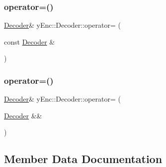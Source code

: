 \hypertarget{classy_enc_1_1_decoder_a7d1922d028848caa6ed0bb8f9c7662ab}{}\label{classy_enc_1_1_decoder_a7d1922d028848caa6ed0bb8f9c7662ab} 
\subsubsection{\texorpdfstring{operator=()}{operator=()}\hspace{0.1cm}{\footnotesize\ttfamily [1/2]}}
{\footnotesize\ttfamily \hyperlink{classy_enc_1_1_decoder}{Decoder}\& y\+Enc\+::\+Decoder\+::operator= (\begin{DoxyParamCaption}\item[{const \hyperlink{classy_enc_1_1_decoder}{Decoder} \&}]{ }\end{DoxyParamCaption})\hspace{0.3cm}{\ttfamily [default]}}

\hypertarget{classy_enc_1_1_decoder_aa279074f4cf635d9419c3f631c425341}{}\label{classy_enc_1_1_decoder_aa279074f4cf635d9419c3f631c425341} 
\subsubsection{\texorpdfstring{operator=()}{operator=()}\hspace{0.1cm}{\footnotesize\ttfamily [2/2]}}
{\footnotesize\ttfamily \hyperlink{classy_enc_1_1_decoder}{Decoder}\& y\+Enc\+::\+Decoder\+::operator= (\begin{DoxyParamCaption}\item[{\hyperlink{classy_enc_1_1_decoder}{Decoder} \&\&}]{ }\end{DoxyParamCaption})\hspace{0.3cm}{\ttfamily [default]}}



\subsection{Member Data Documentation}
\hypertarget{classy_enc_1_1_decoder_ae0a4c10d6eecdc2e0c93f60a81c9e5e5}{}\label{classy_enc_1_1_decoder_ae0a4c10d6eecdc2e0c93f60a81c9e5e5} 
